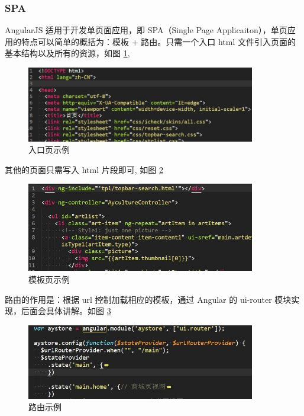 \documentclass[UTF8]{ctexbook}
\begin{document}
{{            \subsubsection{SPA}
              \label{subsubsec:spa}
                AngularJS 适用于开发单页面应用，即 SPA（Single Page Applicaiton），单页应用的特点可以简单的概括为：模板 + 路由。只需一个入口 html 文件引入页面的基本结构以及所有的资源，如图 \ref{fig:index},
                \begin{figure}[H]
                  \centering
                  \includegraphics[width=10cm]{./img/index.jpg}
                  \caption{入口页示例}
                  \label{fig:index}
                \end{figure}

                其他的页面只需写入 html 片段即可, 如图 \ref{fig:tpl}

                \begin{figure}[H]
                  \centering
                  \includegraphics[width=10cm]{./img/tpl.jpg}
                  \caption{模板页示例}
                  \label{fig:tpl}
                \end{figure}

                路由的作用是：根据 url 控制加载相应的模板，通过 Angular 的 ui-router 模块实现，后面会具体讲解。如图 \ref{fig:router}

                \begin{figure}[H]
                  \centering
                  \includegraphics[width=10cm]{./img/router.jpg}
                  \caption{路由示例}
                  \label{fig:router}
                \end{figure}

}}
\end{document}
